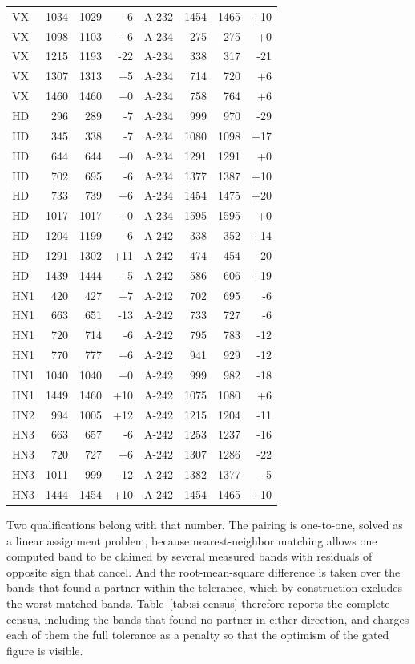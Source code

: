 \documentclass[11pt]{article}
\begin{document}
\begin{table}[p]
{\begin{tabular}{lrrr@{\hskip 2em}lrrr}
VX & 1034 & 1029 & -6 & A-232 & 1454 & 1465 & +10 \\
VX & 1098 & 1103 & +6 & A-234 & 275 & 275 & +0 \\
VX & 1215 & 1193 & -22 & A-234 & 338 & 317 & -21 \\
VX & 1307 & 1313 & +5 & A-234 & 714 & 720 & +6 \\
VX & 1460 & 1460 & +0 & A-234 & 758 & 764 & +6 \\
HD & 296 & 289 & -7 & A-234 & 999 & 970 & -29 \\
HD & 345 & 338 & -7 & A-234 & 1080 & 1098 & +17 \\
HD & 644 & 644 & +0 & A-234 & 1291 & 1291 & +0 \\
HD & 702 & 695 & -6 & A-234 & 1377 & 1387 & +10 \\
HD & 733 & 739 & +6 & A-234 & 1454 & 1475 & +20 \\
HD & 1017 & 1017 & +0 & A-234 & 1595 & 1595 & +0 \\
HD & 1204 & 1199 & -6 & A-242 & 338 & 352 & +14 \\
HD & 1291 & 1302 & +11 & A-242 & 474 & 454 & -20 \\
HD & 1439 & 1444 & +5 & A-242 & 586 & 606 & +19 \\
HN1 & 420 & 427 & +7 & A-242 & 702 & 695 & -6 \\
HN1 & 663 & 651 & -13 & A-242 & 733 & 727 & -6 \\
HN1 & 720 & 714 & -6 & A-242 & 795 & 783 & -12 \\
HN1 & 770 & 777 & +6 & A-242 & 941 & 929 & -12 \\
HN1 & 1040 & 1040 & +0 & A-242 & 999 & 982 & -18 \\
HN1 & 1449 & 1460 & +10 & A-242 & 1075 & 1080 & +6 \\
HN2 & 994 & 1005 & +12 & A-242 & 1215 & 1204 & -11 \\
HN3 & 663 & 657 & -6 & A-242 & 1253 & 1237 & -16 \\
HN3 & 720 & 727 & +6 & A-242 & 1307 & 1286 & -22 \\
HN3 & 1011 & 999 & -12 & A-242 & 1382 & 1377 & -5 \\
HN3 & 1444 & 1454 & +10 & A-242 & 1454 & 1465 & +10 \\
\bottomrule
\end{tabular}
}
\end{table}
\clearpage

Two qualifications belong with that number. The pairing is one-to-one, solved as a linear
assignment problem, because nearest-neighbor matching allows one computed band to be
claimed by several measured bands with residuals of opposite sign that cancel. And the root-mean-square difference is taken over the bands
that found a partner within the tolerance, which by construction excludes the worst-matched
bands. Table~\ref{tab:si-census} therefore reports the complete census, including the bands
that found no partner in either direction, and charges each of them the full tolerance as a
penalty so that the optimism of the gated figure is visible.
\end{document}
